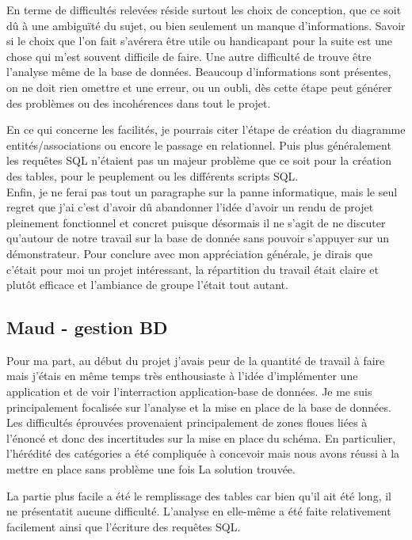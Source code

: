 \documentclass[10pt, a4paper]{article}
\begin{document}
En terme de difficultés relevées réside surtout les choix de conception, que ce soit dû à une
ambiguïté du sujet, ou bien seulement un manque d'informations. Savoir si le choix que l'on fait
s'avérera être utile ou handicapant pour la suite est une chose qui m'est souvent difficile de
faire. Une autre difficulté de trouve être l'analyse même de la base de données. Beaucoup 
d'informations sont présentes, on ne doit rien omettre et une erreur, ou un oubli, dès cette 
étape peut générer des problèmes ou des incohérences dans tout le projet.

En ce qui concerne les facilités, je pourrais citer l'étape de création du diagramme 
entités/associations ou encore le passage en relationnel. Puis plus généralement les requêtes 
SQL n'étaient pas un majeur problème que ce soit pour la création des tables, pour le 
peuplement ou les différents scripts SQL.\\

Enfin, je ne ferai pas tout un paragraphe sur la panne informatique, mais le seul regret que 
j'ai c'est d'avoir dû abandonner l'idée d'avoir un rendu de projet pleinement fonctionnel et 
concret puisque désormais il ne s'agit de ne discuter qu'autour de notre travail sur la base de
donnée sans pouvoir s'appuyer sur un démonstrateur.
Pour conclure avec mon appréciation générale, je dirais que c'était pour moi un projet 
intéressant, la répartition du travail était claire et plutôt efficace et l'ambiance de groupe 
l'était tout autant.

\subsection{Maud - gestion BD}
Pour ma part, au début du projet j'avais peur de la quantité de travail à faire mais j'étais
en même temps très enthousiaste à l'idée d'implémenter une application et de voir l'interraction
application-base de données. Je me suis principalement focalisée sur l'analyse et la mise en 
place de la base de données.\\

Les difficultés éprouvées provenaient principalement de zones floues liées à l'énoncé et donc
des incertitudes sur la mise en place du schéma. En particulier, l'hérédité des catégories a été
compliquée à concevoir mais nous avons réussi à la mettre en place sans problème une fois La
solution trouvée.

La partie plus facile a été le remplissage des tables car bien qu'il ait été long, il ne
présentatit aucune difficulté. L'analyse en elle-même a été faite relativement facilement
ainsi que l'écriture des requêtes SQL.\\
\end{document}

